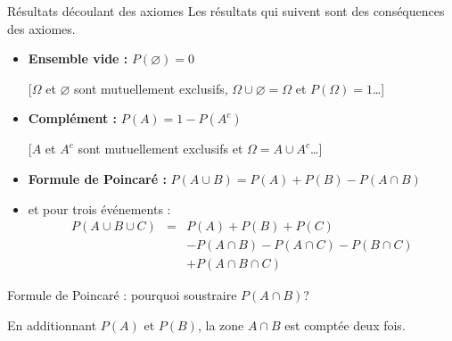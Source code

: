 \documentclass{BeamerTemplate}
\newcommand{\cadreVenn}{\draw (0,0) rectangle (4,3); \node at (3.7,2.7) {\scriptsize $\Omega$};}
\newcommand{\contourAB}{%
  \draw (1.5,1.5) circle (1); \node at (0.6,2.4) {$A$};
  \draw (2.5,1.5) circle (1); \node at (3.4,2.4) {$B$};}
\begin{document}
\begin{frame}[t]{Résultats découlant des axiomes}
  Les résultats qui suivent sont des conséquences des axiomes.

  \begin{itemize}\itemsep 3mm
    \item<1-> \textbf{Ensemble vide :} $P(\varnothing) = 0$

      {\color{gray}[$\Omega$ et $\varnothing$ sont mutuellement exclusifs,
      $\Omega \cup \varnothing = \Omega$ et $P(\Omega) = 1$\ldots]}
    \item<2-> \textbf{Complément :} $P(A) = 1 - P(A^c)$

      {\color{gray}[$A$ et $A^c$ sont mutuellement exclusifs et
      $\Omega = A \cup A^c$\ldots]}
    \item<3-> \textbf{Formule de Poincaré :}
      $P(A \cup B) = P(A) + P(B) - P(A \cap B)$
    \item<4-> et pour trois événements :
      \[
        \begin{array}{lll}
          P(A \cup B \cup C) &=& P(A) + P(B) + P(C) \\
          && - P(A \cap B) - P(A \cap C) - P(B \cap C) \\
          && + P(A \cap B \cap C)
        \end{array}
      \]
  \end{itemize}
\end{frame}

\begin{frame}[t]{Formule de Poincaré : pourquoi soustraire $P(A \cap B)$?}
  \centering

  \bigskip
  \raggedright
  En additionnant $P(A)$ et $P(B)$, la zone $A \cap B$ est comptée
  \alert{deux fois}.
\end{frame}
\end{document}
